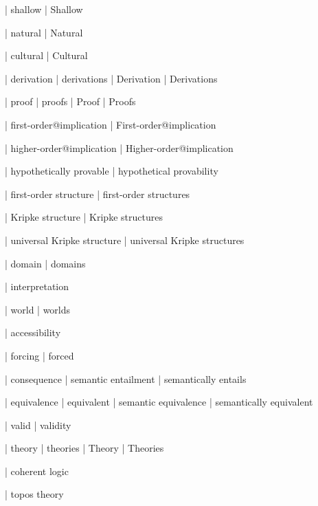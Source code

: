  | shallow
 | Shallow

 | natural
 | Natural

 | cultural
 | Cultural

 | derivation
 | derivations
 | Derivation
 | Derivations

 | proof
 | proofs
 | Proof
 | Proofs
 
 | first-order@implication
 | First-order@implication

 | higher-order@implication
 | Higher-order@implication

 | hypothetically provable
 | hypothetical provability

 | first-order structure
 | first-order structures

 | Kripke structure
 | Kripke structures

 | universal Kripke structure
 | universal Kripke structures

 | domain
 | domains

 | interpretation

 | world
 | worlds

 | accessibility

 | forcing
 | forced

 | consequence
 | semantic entailment
 | semantically entails

 | equivalence
 | equivalent
 | semantic equivalence
 | semantically equivalent

 | valid
 | validity

 | theory
 | theories
 | Theory
 | Theories

 | coherent logic

 | topos theory


